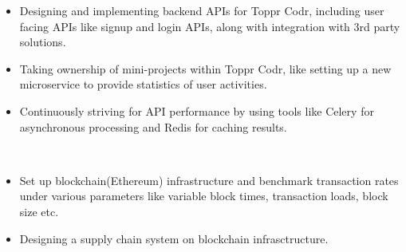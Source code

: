 \documentclass[10pt,a4paper,ragged2e]{altacv}
\begin{document}

\begin{fullwidth}
\makecvheader
\end{fullwidth}



\begin{itemize}
    \item Designing and implementing backend APIs for Toppr Codr, including user facing APIs like signup and login APIs, along with integration with 3rd party solutions.
    \item Taking ownership of mini-projects within Toppr Codr, like setting up a new microservice to provide statistics of user activities.
    \item Continuously striving for API performance by using tools like Celery for asynchronous processing and Redis for caching results.
\end{itemize}

\divider
\\
\begin{itemize}
\item Set up blockchain(Ethereum) infrastructure and benchmark transaction rates under various parameters like variable block times, transaction loads, block size etc.
\item Designing a supply chain system on blockchain infrasctructure.
\end{itemize}
\end{document}

